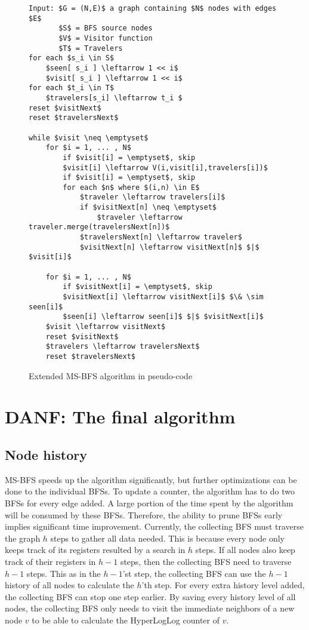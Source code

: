 \begin{figure}[h]
    \begin{lstlisting}[mathescape]
Input: $G = (N,E)$ a graph containing $N$ nodes with edges $E$
       $S$ = BFS source nodes
       $V$ = Visitor function
       $T$ = Travelers
for each $s_i \in S$
    $seen[ s_i ] \leftarrow 1 << i$
    $visit[ s_i ] \leftarrow 1 << i$
for each $t_i \in T$
    $travelers[s_i] \leftarrow t_i $
reset $visitNext$
reset $travelersNext$

while $visit \neq \emptyset$
    for $i = 1, ... , N$
        if $visit[i] = \emptyset$, skip
        $visit[i] \leftarrow V(i,visit[i],travelers[i])$
        if $visit[i] = \emptyset$, skip
        for each $n$ where $(i,n) \in E$
            $traveler \leftarrow travelers[i]$
            if $visitNext[n] \neq \emptyset$
                $traveler \leftarrow traveler.merge(travelersNext[n])$
            $travelersNext[n] \leftarrow traveler$
            $visitNext[n] \leftarrow visitNext[n]$ $|$ $visit[i]$

    for $i = 1, ... , N$
        if $visitNext[i] = \emptyset$, skip
        $visitNext[i] \leftarrow visitNext[i]$ $\& \sim seen[i]$
        $seen[i] \leftarrow seen[i]$ $|$ $visitNext[i]$
    $visit \leftarrow visitNext$
    reset $visitNext$
    $travelers \leftarrow travelersNext$
    reset $travelersNext$
    \end{lstlisting}
    \caption{Extended MS-BFS algorithm in pseudo-code}
    \label{fig:extended_ms-bfs_algorithm}
\end{figure}


\section{DANF: The final algorithm}
\subsection{Node history}

MS-BFS speeds up the algorithm significantly, but further optimizations can be done to the individual BFSs. To update a counter, the algorithm has to do two BFSs for every edge added. A large portion of the time spent by the algorithm will be consumed by these BFSs. Therefore, the ability to prune BFSs early implies significant time improvement. Currently, the collecting BFS must traverse the graph $h$ steps to gather all data needed. This is because every node only keeps track of its registers resulted by a search in $h$ steps. If all nodes also keep track of their registers in $h-1$ steps, then the collecting BFS need to traverse $h-1$ steps. This as in the $h-1$'st step, the collecting BFS can use the $h-1$ history of all nodes to calculate the $h$'th step. For every extra history level added, the collecting BFS can stop one step earlier. By saving every history level of all nodes, the collecting BFS only needs to visit the immediate neighbors of a new node $v$ to be able to calculate the HyperLogLog counter of $v$. 

